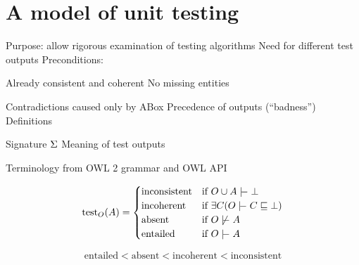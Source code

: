 \documentclass[paper.tex]{subfiles}
\begin{document}
\section{A model of unit testing}
\label{sec:model}

\begin{todos}
  \todo Purpose: allow rigorous examination of testing algorithms
  \todo Need for different test outputs
  \todo Preconditions:
  \begin{todos}
    \todo Already consistent and coherent
    \todo No missing entities
  \end{todos}
  \todo Contradictions caused only by ABox
  \todo Precedence of outputs (``badness'')
  \todo Definitions
  \begin{todos}
    \todo Signature $\Sigma$
    \todo Meaning of test outputs
  \end{todos}
  \todo Terminology from OWL 2 grammar and OWL API
\end{todos}

\[
  \test_O(A) =
  \begin{cases}
    \mathrm{inconsistent} &
      \text{if } O \union A \sementails \bot \\
    \mathrm{incoherent} &
      \text{if } \exists C (O \sementails C \sqsubseteq \nothing) \\
    \mathrm{absent} &
      \text {if } O \not\sementails A \\
    \mathrm{entailed} &
      \text{if } O \sementails A \\
  \end{cases}
\]

\[ \mathrm{entailed} < \mathrm{absent} < \mathrm{incoherent} < \mathrm{inconsistent} \]
\end{document}

